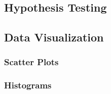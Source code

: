 \subsection{Hypothesis Testing}




\subsection{Data Visualization}

\subsubsection{Scatter Plots}

\subsubsection{Histograms}

